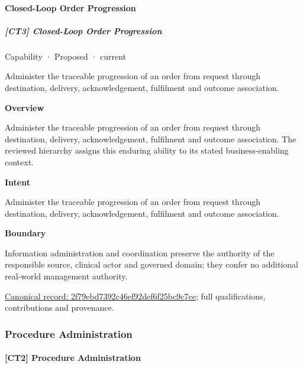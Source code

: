 \paragraph{Closed-Loop Order Progression}

\subparagraph{[CT3] Closed-Loop Order Progression}

\label{element:2f79ebd7392c46ef92def6f25bc9c7ce}
{\small Capability · Proposed · current}\par

Administer the traceable progression of an order from request through destination, delivery, acknowledgement, fulfilment and outcome association.



\textbf{Overview}



Administer the traceable progression of an order from request through destination, delivery, acknowledgement, fulfilment and outcome association. The reviewed hierarchy assigns this enduring ability to its stated business-enabling context.



\textbf{Intent}



Administer the traceable progression of an order from request through destination, delivery, acknowledgement, fulfilment and outcome association.



\textbf{Boundary}



Information administration and coordination preserve the authority of the responsible source, clinical actor and governed domain; they confer no additional real-world management authority.


{\footnotesize \href{../../../../continuum/strategy/capability/2f79ebd7392c46ef92def6f25bc9c7ce.md}{Canonical record: 2f79ebd7392c46ef92def6f25bc9c7ce}; full qualifications, contributions and provenance.}\par
\subsubsection{Procedure Administration}

\paragraph{[CT2] Procedure Administration}

